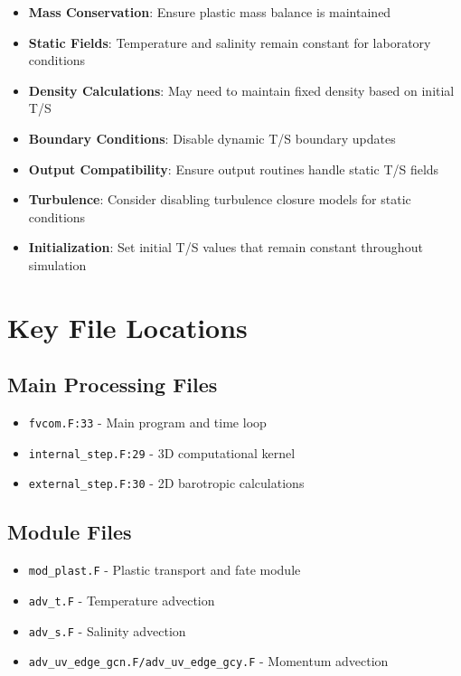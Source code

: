 \documentclass[12pt,a4paper]{article}
\begin{document}
\begin{itemize}
    \item \textbf{Mass Conservation}: Ensure plastic mass balance is maintained
    \item \textbf{Static Fields}: Temperature and salinity remain constant for laboratory conditions
    \item \textbf{Density Calculations}: May need to maintain fixed density based on initial T/S
    \item \textbf{Boundary Conditions}: Disable dynamic T/S boundary updates
    \item \textbf{Output Compatibility}: Ensure output routines handle static T/S fields
    \item \textbf{Turbulence}: Consider disabling turbulence closure models for static conditions
    \item \textbf{Initialization}: Set initial T/S values that remain constant throughout simulation
\end{itemize}

\section{Key File Locations}

\subsection{Main Processing Files}
\begin{itemize}
    \item \texttt{fvcom.F:33} - Main program and time loop
    \item \texttt{internal\_step.F:29} - 3D computational kernel
    \item \texttt{external\_step.F:30} - 2D barotropic calculations
\end{itemize}

\subsection{Module Files}
\begin{itemize}
    \item \texttt{mod\_plast.F} - Plastic transport and fate module
    \item \texttt{adv\_t.F} - Temperature advection
    \item \texttt{adv\_s.F} - Salinity advection
    \item \texttt{adv\_uv\_edge\_gcn.F/adv\_uv\_edge\_gcy.F} - Momentum advection
\end{itemize}
\end{document}
